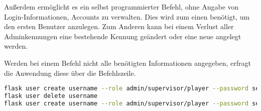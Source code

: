 Außerdem ermöglicht es ein selbst programmierter Befehl, ohne Angabe von \linebreak
Login-Informationen, Accounts zu verwalten. Dies wird zum einen benötigt, um den ersten Benutzer anzulegen. Zum Anderen kann bei einem Verlust aller Adminkennungen eine \linebreak bestehende Kennung geändert oder eine neue angelegt werden. 

Werden bei einem Befehl nicht alle benötigten Informationen angegeben, erfragt die \linebreak Anwendung diese über die Befehlszeile.

\begin{lstlisting}[language=bash, frame=single, caption={GIS CLI}, captionpos=b, label={lst:gis-cli}]
flask user create username --role admin/supervisor/player --password secure_pw
flask user delete username
flask user create username --role admin/supervisor/player --password secure_pw
\end{lstlisting}